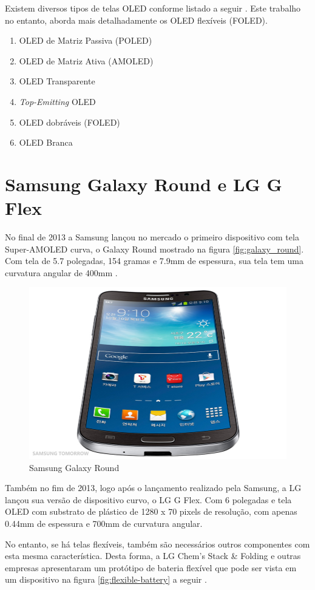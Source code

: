 Existem diversos tipos de telas OLED conforme listado a seguir \cite{HSWOLED}. Este trabalho no entanto, aborda mais detalhadamente os OLED flexíveis (FOLED).

\begin{enumerate}
	\item OLED de Matriz Passiva (POLED)
	\item OLED de Matriz Ativa (AMOLED)
	\item OLED Transparente 
	\item \textit{Top-Emitting} OLED 
	\item OLED dobráveis (FOLED)
	\item OLED Branca 
\end{enumerate}


\section{Samsung Galaxy Round e LG G Flex}
\label{sec:devicesnomercado}

No final de 2013 a Samsung lançou no mercado o primeiro dispositivo com tela Super-AMOLED curva, o Galaxy Round mostrado na figura \ref{fig:galaxy_round}. Com tela de 5.7 polegadas, 154 gramas e 7.9mm de espessura, sua tela tem uma curvatura angular de 400mm \cite{NOLEDDN}.

\begin{figure}[!h]
  \centering
  \includegraphics[width=.40\textwidth]{./figuras/galaxy-round} 
  \caption{Samsung Galaxy Round}
  \label{fig:galaxy-round} 
\end{figure}

Também no fim de 2013, logo após o lançamento realizado pela Samsung, a LG lançou sua versão de dispositivo curvo, o LG G Flex. Com 6 polegadas e tela OLED com substrato de plástico de 1280 x 70 pixels de resolução, com apenas 0.44mm de espessura e 700mm de curvatura angular.

No entanto, se há telas flexíveis, também são necessários outros componentes com esta mesma característica. Desta forma, a LG Chem’s Stack \& Folding e outras empresas apresentaram um protótipo de bateria flexível que pode ser vista em um dispositivo na figura \ref{fig:flexible-battery} a seguir \cite{NOLEDDN}.

